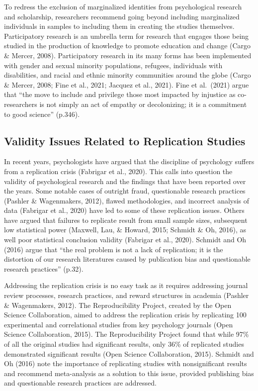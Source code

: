 \documentclass[
  11pt,
]{book}
\begin{document}
To redress the exclusion of marginalized identities from psychological research and scholarship, researchers recommend going beyond including marginalized individuals in samples to including them in creating the studies themselves. Participatory research is an umbrella term for research that engages those being studied in the production of knowledge to promote education and change (Cargo \& Mercer, 2008). Participatory research in its many forms has been implemented with gender and sexual minority populations, refugees, individuals with disabilities, and racial and ethnic minority communities around the globe (Cargo \& Mercer, 2008; Fine et al., 2021; Jacquez et al., 2021). Fine et al.~(2021) argue that ``the move to include and privilege those most impacted by injustice as co-researchers is not simply an act of empathy or decolonizing; it is a commitment to good science'' (p.346).

\subsection{Validity Issues Related to Replication Studies}\label{validity-issues-related-to-replication-studies}

In recent years, psychologists have argued that the discipline of psychology suffers from a replication crisis (Fabrigar et al., 2020). This calls into question the validity of psychological research and the findings that have been reported over the years. Some notable cases of outright fraud, questionable research practices (Pashler \& Wagenmakers, 2012), flawed methodologies, and incorrect analysis of data (Fabrigar et al., 2020) have led to some of these replication issues. Others have argued that failures to replicate result from small sample sizes, subsequent low statistical power (Maxwell, Lau, \& Howard, 2015; Schmidt \& Oh, 2016), as well poor statistical conclusion validity (Fabrigar et al., 2020). Schmidt and Oh (2016) argue that ``the real problem is not a lack of replication; it is the distortion of our research literatures caused by publication bias and questionable research practices'' (p.32).

Addressing the replication crisis is no easy task as it requires addressing journal review processes, research practices, and reward structures in academia (Pashler \& Wagenmakers, 2012). The Reproducibility Project, created by the Open Science Collaboration, aimed to address the replication crisis by replicating 100 experimental and correlational studies from key psychology journals (Open Science Collaboration, 2015). The Reproducibility Project found that while 97\% of all the original studies had significant results, only 36\% of replicated studies demonstrated significant results (Open Science Collaboration, 2015). Schmidt and Oh (2016) note the importance of replicating studies with nonsignificant results and recommend meta-analysis as a solution to this issue, provided publishing bias and questionable research practices are addressed.
\end{document}
